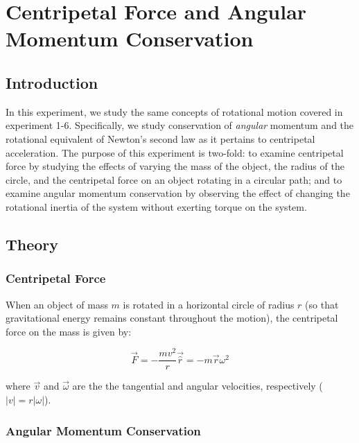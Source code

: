 \chapter{Centripetal Force and Angular Momentum Conservation}
\label{chap:centripetal}
\section{Introduction}
In this experiment, we study the same concepts of rotational motion covered in experiment 1-6. Specifically, we study conservation of {\it{angular}} momentum and the rotational equivalent of Newton's second law as it pertains to centripetal acceleration. The purpose of this experiment is two-fold: to examine centripetal force by studying the effects of varying the mass of the object, the radius of the circle, and the centripetal force on an object rotating in a circular path; and to examine angular momentum conservation by observing the effect of changing the rotational inertia of the system without exerting torque on the system.

\section{Theory}
\subsection{Centripetal Force}
When an object of mass $m$ is rotated in a horizontal circle of radius $r$ (so that gravitational energy remains constant throughout the motion), the centripetal force on the mass is given by:

\begin{equation}
\vec F = - \frac{m v^{2}}{r} \vec {\hat r} =- m \vec r \omega ^2
\end{equation}

\noindent where $\vec v$ and $\vec \omega$ are the the tangential and angular velocities, respectively ($|v| = r |\omega|$).

\subsection{Angular Momentum Conservation}


